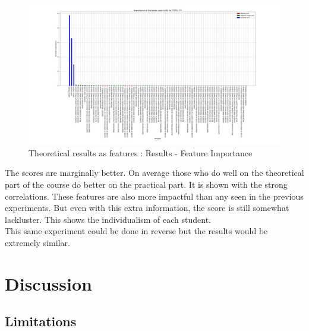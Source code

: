 \documentclass[a4paper,11pt]{report}
\numberwithin{figure}{section} %
\begin{document}
      \begin{figure}[H]
      \centering
      \includegraphics[width=.95\linewidth]{plots/test2_var_importance_TOTAL_TP_2018-05-18_02_51_43.png}
      \caption{Theoretical results as features : Results - Feature Importance}
      \label{fig:test2_2}
      \end{figure}
    The scores are marginally better.
    On average those who do well on the theoretical part of the course do better on the practical part.
    It is shown with the strong correlations.
    These features are also more impactful than any seen in the previous experiments.
    But even with this extra information, the score is still somewhat lackluster.
    This shows the individualism of each student.\\

    This same experiment could be done in reverse but the results would be extremely similar.
    
\chapter{Discussion} \label{Discussion}

    \section{Limitations}
\end{document}
